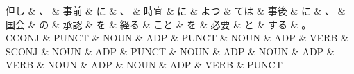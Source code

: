 \documentclass[tikz,border=5pt]{standalone}
\begin{document}
\normalsize
\begin{dependency}[edge unit distance=11.9pt]
    \begin{deptext}[column sep=1em]
        但し \& 、 \& 事前 \& に \& 、 \& 時宜 \& に \& よつ \& ては \& 事後 \& に \& 、 \& 国会 \& の \& 承認 \& を \& 経る \& こと \& を \& 必要 \& と \& する \& 。\\
        CCONJ \& PUNCT \& NOUN \& ADP \& PUNCT \& NOUN \& ADP \& VERB \& SCONJ \& NOUN \& ADP \& PUNCT \& NOUN \& ADP \& NOUN \& ADP \& VERB \& NOUN \& ADP \& NOUN \& ADP \& VERB \& PUNCT\\
    \end{deptext}
\end{dependency}
\end{document}
